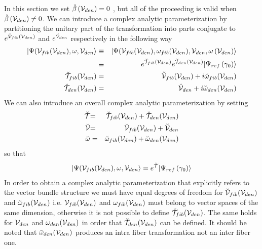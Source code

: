 In this section we set ${\cal \breve{\beta}}\left( {\cal V}_{den}\right) =0$%
, but all of the proceeding is valid when ${\cal \breve{\beta}}\left( {\cal V%
}_{den}\right) \neq 0$. We can introduce a complex analytic parameterization
by partitioning the unitary part of the transformation into parts conjugate
to $e^{{\cal \breve{V}}_{fib}({\cal V}_{den})}$ and $e^{{\cal \breve{V}}%
_{den}}$ respectively in the following way 
\begin{eqnarray}
|\Psi ({\cal V}_{fib}({\cal V}_{den}),\omega ,{\cal V}_{den}\rangle &\equiv
&|\Psi ({\cal V}_{fib}({\cal V}_{den}),\omega _{fib}({\cal V}_{den}),{\cal V}%
_{den},\omega \left( {\cal V}_{den}\right) \rangle  \nonumber \\
&\equiv &e^{{\cal \breve{T}}_{fib}({\cal V}_{den})}e^{{\cal \breve{T}}_{den}(%
{\cal V}_{den})}|\Psi _{ref}\left( \gamma _{0}\right) \rangle  \nonumber \\
{\cal \breve{T}}_{fib}({\cal V}_{den}) &=&{\cal \breve{V}}_{fib}({\cal V}%
_{den})+i\breve{\omega}_{fib}({\cal V}_{den})  \nonumber \\
{\cal \breve{T}}_{den}({\cal V}_{den}) &=&{\cal \breve{V}}_{den}+i\breve{%
\omega}_{den}({\cal V}_{den})
\end{eqnarray}%
We can also introduce an overall complex analytic parameterization by
setting 
\begin{eqnarray}
{\cal \breve{T}} &{\cal =}&{\cal \breve{T}}_{fib}({\cal V}_{den})+{\cal 
\breve{T}}_{den}({\cal V}_{den})  \nonumber \\
{\cal \breve{V}} &{\cal =}&{\cal \breve{V}}_{fib}({\cal V}_{den})+{\cal 
\breve{V}}_{den}  \nonumber \\
\breve{\omega} &=&\breve{\omega}_{fib}({\cal V}_{den})+\breve{\omega}_{den}(%
{\cal V}_{den})
\end{eqnarray}%
so that 
\begin{equation}
|\Psi ({\cal V}_{fib}({\cal V}_{den}),\omega ,{\cal V}_{den}\rangle =e^{%
{\cal \breve{T}}}|\Psi _{ref}\left( \gamma _{0}\right) \rangle
\end{equation}%
In order to obtain a complex analytic parameterization that explicitly
refers to the vector bundle structure we must have equal degrees of freedom
for ${\cal \breve{V}}_{fib}({\cal V}_{den})$ and $\breve{\omega}_{fib}({\cal %
V}_{den})$ i.e. ${\cal V}_{fib}({\cal V}_{den})$ and $\omega _{fib}({\cal V}%
_{den})$ must belong to vector spaces of the same dimension, otherwise it is
not possible to define ${\cal \breve{T}}_{fib}({\cal V}_{den})$. The same
holds for ${\cal V}_{den}$ and $\omega _{den}({\cal V}_{den})$ in order that 
${\cal \breve{T}}_{den}({\cal V}_{den})$ can be defined. It should be noted
that $\breve{\omega}_{den}({\cal V}_{den})$ produces an intra fiber
transformation not an inter fiber one.

